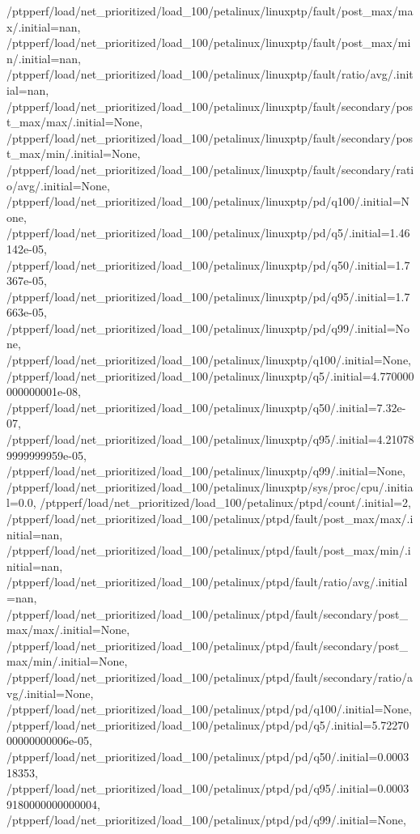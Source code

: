 {    /ptpperf/load/net_prioritized/load_100/petalinux/linuxptp/fault/post_max/max/.initial=nan,
    /ptpperf/load/net_prioritized/load_100/petalinux/linuxptp/fault/post_max/min/.initial=nan,
    /ptpperf/load/net_prioritized/load_100/petalinux/linuxptp/fault/ratio/avg/.initial=nan,
    /ptpperf/load/net_prioritized/load_100/petalinux/linuxptp/fault/secondary/post_max/max/.initial=None,
    /ptpperf/load/net_prioritized/load_100/petalinux/linuxptp/fault/secondary/post_max/min/.initial=None,
    /ptpperf/load/net_prioritized/load_100/petalinux/linuxptp/fault/secondary/ratio/avg/.initial=None,
    /ptpperf/load/net_prioritized/load_100/petalinux/linuxptp/pd/q100/.initial=None,
    /ptpperf/load/net_prioritized/load_100/petalinux/linuxptp/pd/q5/.initial=1.46142e-05,
    /ptpperf/load/net_prioritized/load_100/petalinux/linuxptp/pd/q50/.initial=1.7367e-05,
    /ptpperf/load/net_prioritized/load_100/petalinux/linuxptp/pd/q95/.initial=1.7663e-05,
    /ptpperf/load/net_prioritized/load_100/petalinux/linuxptp/pd/q99/.initial=None,
    /ptpperf/load/net_prioritized/load_100/petalinux/linuxptp/q100/.initial=None,
    /ptpperf/load/net_prioritized/load_100/petalinux/linuxptp/q5/.initial=4.770000000000001e-08,
    /ptpperf/load/net_prioritized/load_100/petalinux/linuxptp/q50/.initial=7.32e-07,
    /ptpperf/load/net_prioritized/load_100/petalinux/linuxptp/q95/.initial=4.210789999999959e-05,
    /ptpperf/load/net_prioritized/load_100/petalinux/linuxptp/q99/.initial=None,
    /ptpperf/load/net_prioritized/load_100/petalinux/linuxptp/sys/proc/cpu/.initial=0.0,
    /ptpperf/load/net_prioritized/load_100/petalinux/ptpd/count/.initial=2,
    /ptpperf/load/net_prioritized/load_100/petalinux/ptpd/fault/post_max/max/.initial=nan,
    /ptpperf/load/net_prioritized/load_100/petalinux/ptpd/fault/post_max/min/.initial=nan,
    /ptpperf/load/net_prioritized/load_100/petalinux/ptpd/fault/ratio/avg/.initial=nan,
    /ptpperf/load/net_prioritized/load_100/petalinux/ptpd/fault/secondary/post_max/max/.initial=None,
    /ptpperf/load/net_prioritized/load_100/petalinux/ptpd/fault/secondary/post_max/min/.initial=None,
    /ptpperf/load/net_prioritized/load_100/petalinux/ptpd/fault/secondary/ratio/avg/.initial=None,
    /ptpperf/load/net_prioritized/load_100/petalinux/ptpd/pd/q100/.initial=None,
    /ptpperf/load/net_prioritized/load_100/petalinux/ptpd/pd/q5/.initial=5.7227000000000006e-05,
    /ptpperf/load/net_prioritized/load_100/petalinux/ptpd/pd/q50/.initial=0.000318353,
    /ptpperf/load/net_prioritized/load_100/petalinux/ptpd/pd/q95/.initial=0.00039180000000000004,
    /ptpperf/load/net_prioritized/load_100/petalinux/ptpd/pd/q99/.initial=None,
}

